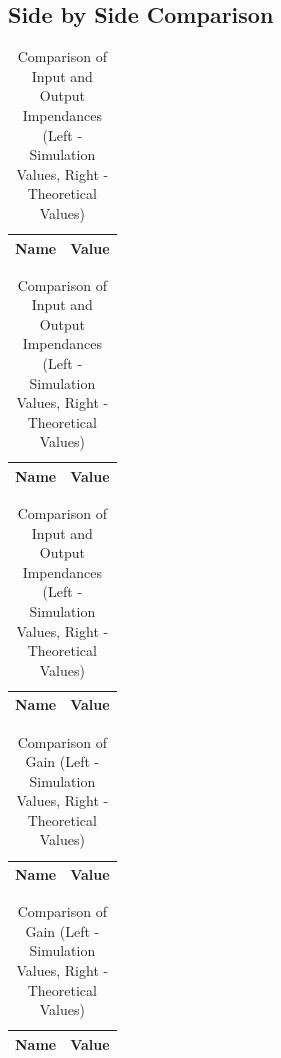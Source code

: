 \subsection{Side by Side Comparison}
\begin{table}[H]
  \centering
  \begin{tabular}{|l|r|}
    \hline    
    {\bf Name} & {\bf Value} \\ \hline
    
  \end{tabular}
  \begin{tabular}{|l|c|}
    \hline
    {\bf Name} & {\bf Value} \\ \hline
    
  \end{tabular}
  \begin{tabular}{|l|c|}
    \hline
    {\bf Name} & {\bf Value} \\ \hline
    
  \end{tabular}
    \caption{Comparison of Input and Output Impendances (Left - Simulation Values, Right - Theoretical Values)}
    \label{tab:comp1}
\end{table}

\begin{table}[H]
  \centering
  \begin{tabular}{|l|r|}
    \hline    
    {\bf Name} & {\bf Value} \\ \hline
    
  \end{tabular}
  \begin{tabular}{|l|c|}
    \hline
    {\bf Name} & {\bf Value} \\ \hline
    
  \end{tabular}
    \caption{Comparison of Gain (Left - Simulation Values, Right - Theoretical Values)}
    \label{tab:comp2}
\end{table}

